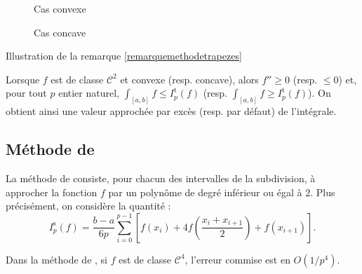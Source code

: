 \begin{marginfigure}[-1cm]
\begin{subfigure}{.5\textwidth}
    \centering
    
    \caption{Cas convexe}
\end{subfigure}%
\begin{subfigure}{.5\textwidth}
    \centering
    
    \caption{Cas concave}
\end{subfigure}
\caption{Illustration de la remarque \ref{remarquemethodetrapezes}}
\end{marginfigure}

\begin{remarque}\label{remarquemethodetrapezes}
Lorsque $f$ est de classe $\mathscr{C}^2$ et convexe (resp. concave), alors $f'' \geqslant 0$ (resp. $\leqslant 0$) et, pour tout $p$ entier naturel, \mbox{$\int_{[a,b]} f \leqslant I_p^\mathrm{t}(f)$} (resp. \mbox{$\int_{[a,b]} f \geqslant I_p^\mathrm{t}(f)$}). On obtient ainsi une valeur approchée par excès (resp. par défaut) de l'intégrale.
\end{remarque}

\subsection{Méthode de }

La méthode de  consiste, pour chacun des intervalles de la subdivision, à approcher la fonction $f$ par un polynôme de degré inférieur ou égal à $2$. Plus précisément, on considère la quantité :
\[
I_p^\mathrm{s}(f) = \frac{b-a}{6 p} \sum_{i=0}^{p-1} \left[f(x_i)+ 4 f\left(\frac{x_i + x_{i+1}}{2}\right) + f(x_{i+1})\right].
\]

\begin{prop}
Dans la méthode de , si $f$ est de classe $\mathscr{C}^4$, l'erreur commise est en $O(1/p^4)$.
\end{prop}


